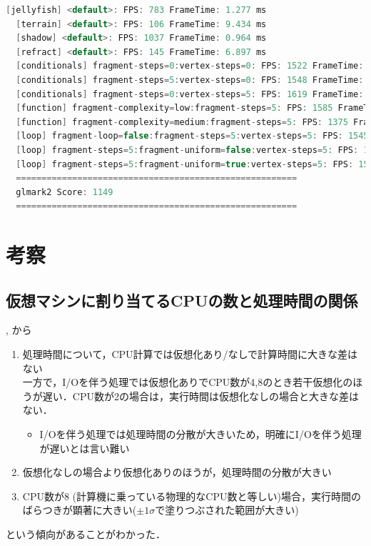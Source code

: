 \documentclass[onecolumn]{preport}
\begin{document}
\begin{lstlisting}[language=c]
  [jellyfish] <default>: FPS: 783 FrameTime: 1.277 ms
  [terrain] <default>: FPS: 106 FrameTime: 9.434 ms
  [shadow] <default>: FPS: 1037 FrameTime: 0.964 ms
  [refract] <default>: FPS: 145 FrameTime: 6.897 ms
  [conditionals] fragment-steps=0:vertex-steps=0: FPS: 1522 FrameTime: 0.657 ms
  [conditionals] fragment-steps=5:vertex-steps=0: FPS: 1548 FrameTime: 0.646 ms
  [conditionals] fragment-steps=0:vertex-steps=5: FPS: 1619 FrameTime: 0.618 ms
  [function] fragment-complexity=low:fragment-steps=5: FPS: 1585 FrameTime: 0.631 ms
  [function] fragment-complexity=medium:fragment-steps=5: FPS: 1375 FrameTime: 0.727 ms
  [loop] fragment-loop=false:fragment-steps=5:vertex-steps=5: FPS: 1545 FrameTime: 0.647 ms
  [loop] fragment-steps=5:fragment-uniform=false:vertex-steps=5: FPS: 1595 FrameTime: 0.627 ms
  [loop] fragment-steps=5:fragment-uniform=true:vertex-steps=5: FPS: 1513 FrameTime: 0.661 ms
  =======================================================
  glmark2 Score: 1149
  =======================================================
\end{lstlisting}\label{figure:gl_linux}

\section{考察}
\subsection{仮想マシンに割り当てるCPUの数と処理時間の関係}
, から
\begin{enumerate}
\item 処理時間について，CPU計算では仮想化あり/なしで計算時間に大きな差はない\\一方で，I/Oを伴う処理では仮想化ありでCPU数が4,8のとき若干仮想化のほうが遅い．CPU数が2の場合は，実行時間は仮想化なしの場合と大きな差はない．
  \begin{itemize}
  \item I/Oを伴う処理では処理時間の分散が大きいため，明確にI/Oを伴う処理が遅いとは言い難い
  \end {itemize}
\item 仮想化なしの場合より仮想化ありのほうが，処理時間の分散が大きい
\item CPU数が8 (計算機に乗っている物理的なCPU数と等しい)場合，実行時間のばらつきが顕著に大きい($\pm 1 \sigma$で塗りつぶされた範囲が大きい)
\end{enumerate}
という傾向があることがわかった．
\end{document}
